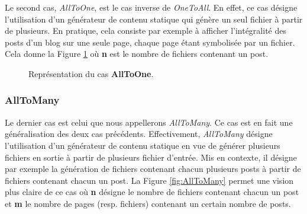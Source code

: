 			Le second cas, \textit{AllToOne}, est le cas inverse de \textit{OneToAll}. En effet, ce cas désigne l'utilisation d'un générateur de contenu statique qui génère un seul fichier à partir de plusieurs. En pratique, cela consiste par exemple à afficher l'intégralité des posts d'un blog sur une seule page, chaque page étant symbolisée par un fichier. Cela donne la Figure \ref{fig:AllToOne} où \textbf{n} est le nombre de fichiers contenant un post.
		
			\begin{figure}
				\begin{center}
					\caption{Représentation du cas \textbf{AllToOne}.}
					\label{fig:AllToOne}
				\end{center}
			\end{figure}
			
		\subsubsection*{AllToMany}
			
			Le dernier cas est celui que nous appellerons \textit{AllToMany}. Ce cas est en fait une généralisation des deux cas précédents. Effectivement, \textit{AllToMany} désigne l'utilisation d'un générateur de contenu statique en vue de générer plusieurs fichiers en sortie à partir de plusieurs fichier d'entrée. Mis en contexte, il désigne par exemple la génération de fichiers contenant chacun plusieurs posts à partir de fichiers contenant chacun un post. La Figure \ref{fig:AllToMany} permet une vision plus claire de ce cas où \textbf{n} désigne le nombre de fichiers contenant chacun un post et \textbf{m} le nombre de pages (resp. fichiers) contenant un certain nombre de posts.\\
			
